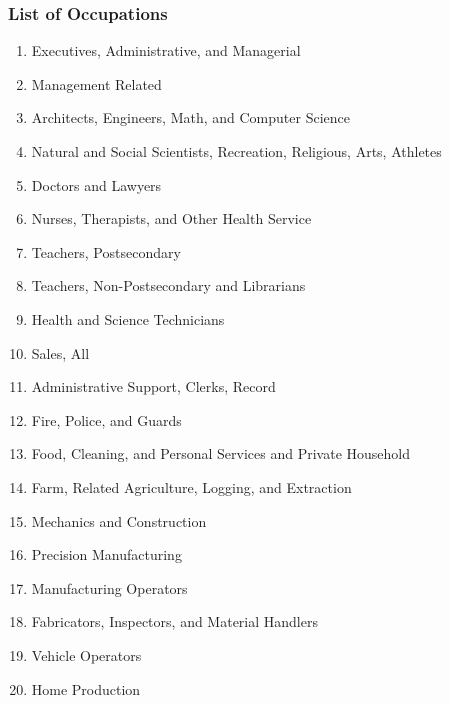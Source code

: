 \documentclass[11pt,hyperref={bookmarks=false},table,aspectratio=169]{beamer}
\begin{document}
\begin{frame}
	\frametitle{List of Occupations} 
	\label{occupations}
 \tiny
	\begin{enumerate}
\item Executives, Administrative, and Managerial
\vspace{-0.2cm}
\item Management Related
\vspace{-0.2cm}
\item Architects, Engineers, Math, and Computer Science
\vspace{-0.2cm}
\item Natural and Social Scientists, Recreation, Religious, Arts, Athletes
\vspace{-0.2cm}
\item Doctors and Lawyers
\vspace{-0.2cm}
\item Nurses, Therapists, and Other Health Service
\vspace{-0.2cm}
\item Teachers, Postsecondary
\vspace{-0.2cm}
\item Teachers, Non-Postsecondary and Librarians
\vspace{-0.2cm}
\item Health and Science Technicians
\vspace{-0.2cm}
\item Sales, All
\vspace{-0.2cm}
\item Administrative Support, Clerks, Record
\vspace{-0.2cm}
\item Fire, Police, and Guards
\vspace{-0.2cm}
\item Food, Cleaning, and Personal Services and Private Household
\vspace{-0.2cm}
\item Farm, Related Agriculture, Logging, and Extraction
\vspace{-0.2cm}
\item Mechanics and Construction
\vspace{-0.2cm}
\item Precision Manufacturing
\vspace{-0.2cm}
\item Manufacturing Operators
\vspace{-0.2cm}
\item Fabricators, Inspectors, and Material Handlers
\vspace{-0.2cm}
\item Vehicle Operators
\vspace{-0.2cm}
\item Home Production 
	\end{enumerate}
 
\hfill	\hyperlink{barriers3}{}
\end{frame}
\end{document}

